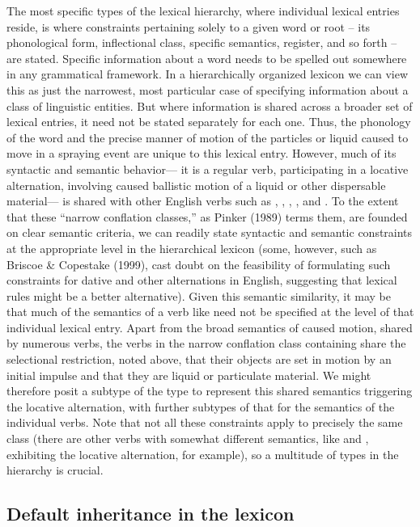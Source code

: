 \documentclass[output=paper]{langsci/langscibook}
\begin{document}
The most specific types of the lexical hierarchy, where individual lexical entries reside, is where constraints pertaining solely to a given word or root -- its phonological form, inflectional class, specific semantics, register, and so forth -- are stated.
Specific information about a word needs to be spelled out somewhere in any grammatical framework.
In a hierarchically organized lexicon we can view this as just the narrowest, most particular case of specifying information about a class of linguistic entities.
But where information is shared across a broader set of lexical entries, it need not be stated separately for each one.
Thus, the phonology of the word  and the precise manner of motion of the particles or liquid caused to move in a spraying event are unique to this lexical entry.
However, much of its syntactic and semantic behavior--- it is a regular verb,  participating in a locative alternation, involving caused ballistic motion of a liquid or other dispersable material--- is shared with other English verbs such as , , , , and .
To the extent that these ``narrow conflation classes,'' as Pinker (1989) terms them, are founded on clear semantic criteria, we can readily state syntactic and semantic constraints at the appropriate level in the hierarchical lexicon (some, however, such as Briscoe \& Copestake (1999), cast doubt on the feasibility of formulating such constraints for dative and other alternations in English, suggesting that lexical rules might be a better alternative).
Given this semantic similarity, it may be that much of the semantics of a verb like  need not be specified at the level of that individual lexical entry.
Apart from the broad semantics of caused motion, shared by numerous verbs, the verbs in the narrow conflation class containing  share the selectional restriction, noted above, that their objects are set in motion by an initial impulse and that they are liquid or particulate material.
We might therefore posit a subtype of the type  to represent this shared semantics triggering the locative alternation, with further subtypes of that for the semantics of the individual verbs.
Note that not all these constraints apply to precisely the same class (there are other verbs with somewhat different semantics, like  and , exhibiting the locative alternation, for example), so a multitude of types in the hierarchy is crucial.


\subsection{Default inheritance in the lexicon}
\end{document}
